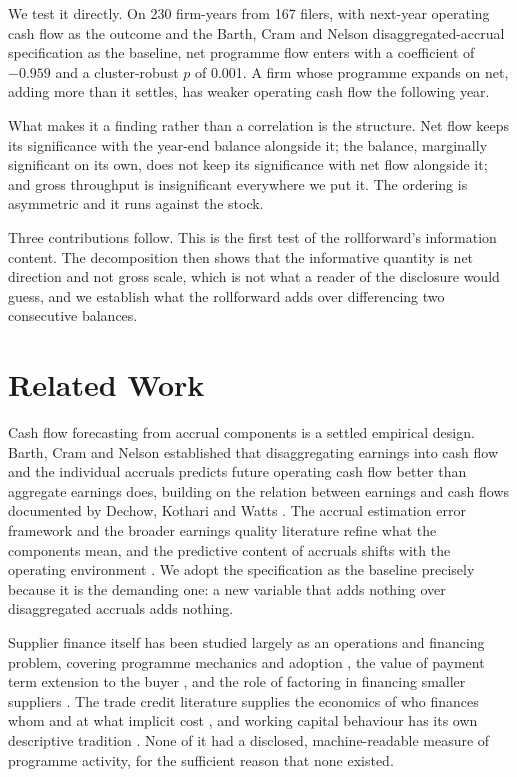 \documentclass[conference,a4paper]{IEEEtran}
\begin{document}
We test it directly. On 230 firm-years from 167 filers, with next-year operating
cash flow as the outcome and the Barth, Cram and Nelson disaggregated-accrual
specification \cite{barth2001} as the baseline, net programme flow enters with a
coefficient of $-0.959$ and a cluster-robust $p$ of 0.001. A firm whose
programme expands on net, adding more than it settles, has weaker operating cash
flow the following year.

What makes it a finding rather than a correlation is the structure. Net flow
keeps its significance with the year-end balance alongside it; the balance,
marginally significant on its own, does not keep its significance with net flow
alongside it; and gross throughput is insignificant everywhere we put it. The
ordering is asymmetric and it runs against the stock.

Three contributions follow. This is the first test of the rollforward's
information content. The decomposition then shows that the informative quantity
is net direction and not gross scale, which is not what a reader of the
disclosure would guess, and we establish what the rollforward adds over
differencing two consecutive balances.

\section{Related Work}

Cash flow forecasting from accrual components is a settled empirical design.
Barth, Cram and Nelson \cite{barth2001} established that disaggregating earnings
into cash flow and the individual accruals predicts future operating cash flow
better than aggregate earnings does, building on the relation between earnings
and cash flows documented by Dechow, Kothari and Watts \cite{dechow1998}. The
accrual estimation error framework \cite{dechow2002} and the broader earnings
quality literature \cite{dechow2010} refine what the components mean, and the
predictive content of accruals shifts with the operating environment
\cite{nallareddy2020}. We adopt the specification as the baseline precisely
because it is the demanding one: a new variable that adds nothing over
disaggregated accruals adds nothing.

Supplier finance itself has been studied largely as an operations and financing
problem, covering programme mechanics and adoption \cite{pfohl2009,
gelsomino2016, wuttke2013, liebl2016}, the value of payment term extension to
the buyer \cite{lekkakos2017}, and the role of factoring in financing smaller
suppliers \cite{klapper2006}. The trade credit literature supplies the economics
of who finances whom and at what implicit cost \cite{petersen1997,
giannetti2011, klapper2012, murfin2015, chod2017}, and working capital behaviour
has its own descriptive tradition \cite{hill2010}. None of it had a disclosed,
machine-readable measure of programme activity, for the sufficient reason that
none existed.
\end{document}
